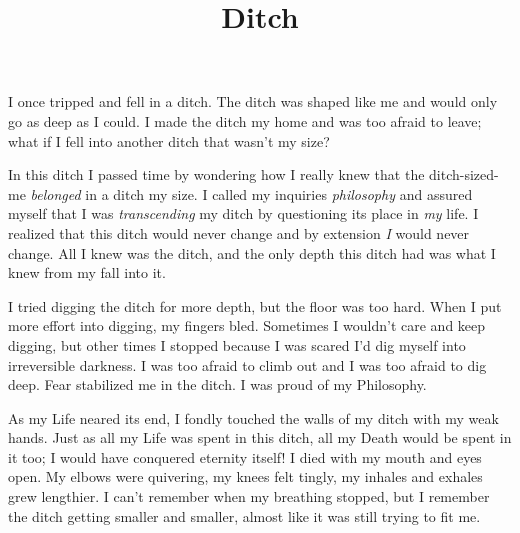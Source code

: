 \documentclass{article}
\title{Ditch}
\begin{document}
 \newline

I once tripped and fell in a ditch. The ditch was shaped like me and
would only go as deep as I could. I made the ditch my home and was too
afraid to leave; what if I fell into another ditch that wasn't my size?
\newline


In this ditch I passed time by wondering how I really knew that the
ditch-sized-me \textit{belonged} in a ditch my size. I called my
inquiries \textit{philosophy} and assured myself that I was
\textit{transcending} my ditch by questioning its place in \textit{my}
life. I realized that this ditch would never change and by extension
\textit{I} would never change. All I knew was the ditch, and the only
depth this ditch had was what I knew from my fall into it. 
\newline


I tried digging the ditch for more depth, but the floor was too hard.
When I put more effort into digging, my fingers bled. Sometimes
I wouldn't care and keep digging, but other times I stopped because
I was scared I'd dig myself into irreversible darkness. I was too afraid
to climb out and I was too afraid to dig deep. Fear stabilized me in the
ditch. I was proud of my Philosophy. \newline


As my Life neared its end, I fondly touched the walls of my ditch with
my weak hands. Just as all my Life was spent in this ditch, all my Death
would be spent in it too; I would have conquered eternity itself! I died
with my mouth and eyes open. My elbows were quivering, my knees felt
tingly, my inhales and exhales grew lengthier. I can't remember when my
breathing stopped, but I remember the ditch getting smaller and smaller,
almost like it was still trying to fit me. \newline
\end{document}
